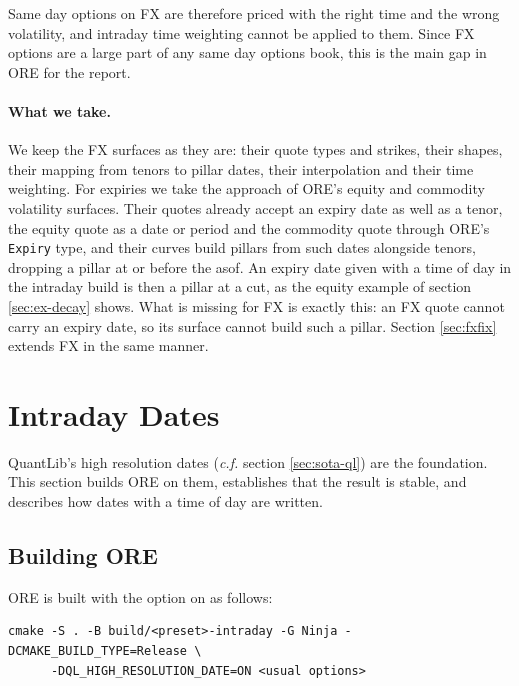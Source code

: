 \documentclass[12pt, a4paper]{article}
\begin{document}
Same day options on FX are therefore priced with the right time and the wrong volatility, and intraday time weighting cannot
be applied to them. Since FX options are a large part of any same day options book, this is the main gap in ORE for the
report.

\paragraph*{What we take.} We keep the FX surfaces as they are: their quote types and strikes, their shapes, their
mapping from tenors to pillar dates, their interpolation and their time weighting. For expiries we take the approach
of ORE's equity and commodity volatility surfaces. Their quotes already accept an expiry date as well as a tenor, the
equity quote as a date or period and the commodity quote through ORE's \texttt{Expiry} type, and their curves build
pillars from such dates alongside tenors, dropping a pillar at or before the asof. An expiry date given with a time of
day in the intraday build is then a pillar at a cut, as the equity example of section \ref{sec:ex-decay} shows. What
is missing for FX is exactly this: an FX quote cannot carry an expiry date, so its surface cannot build such a pillar.
Section \ref{sec:fxfix} extends FX in the same manner.

\section{Intraday Dates}\label{sec:build}

QuantLib's high resolution dates (\textit{c.f.} section \ref{sec:sota-ql}) are the foundation. This section builds ORE on
them, establishes that the result is stable, and describes how dates with a time of day are written.

\subsection{Building ORE}

ORE is built with the option on as follows:

\begin{verbatim}
cmake -S . -B build/<preset>-intraday -G Ninja -DCMAKE_BUILD_TYPE=Release \
      -DQL_HIGH_RESOLUTION_DATE=ON <usual options>
\end{verbatim}
\end{document}
